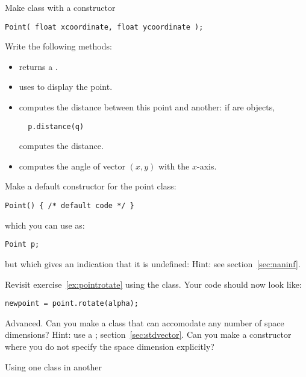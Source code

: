 \begin{exercise}
  \label{ex:geom:point}
  Make class  with a constructor
\begin{verbatim}
Point( float xcoordinate, float ycoordinate );
\end{verbatim}
Write the following methods:
\begin{itemize}
\item {} returns a .
\item  {} uses  to display the point.
\item {} computes the distance between this point and
  another: if  are  objects,
\begin{verbatim}
  p.distance(q)
\end{verbatim}
computes the distance.
\item {} computes the angle of vector $(x,y)$ with the $x$-axis.
\end{itemize}
\end{exercise}


\begin{exercise}
  Make a default constructor for the point class:
\begin{verbatim}
Point() { /* default code */ }
\end{verbatim}
  which you can use as:
\begin{verbatim}
Point p;
\end{verbatim}
but which gives an indication that it is undefined:
%
%
Hint: see section~\ref{sec:naninf}.
\end{exercise}

\begin{exercise}
  \label{ex:pointrotate-class}
  Revisit exercise~\ref{ex:pointrotate} using the 
  class. Your code should now look like:
\begin{verbatim}
newpoint = point.rotate(alpha);
\end{verbatim}
\end{exercise}

\begin{exercise}
  Advanced. Can you make a  class that can accomodate any
  number of space dimensions? Hint: use a ;
  section~\ref{sec:stdvector}. Can you make a constructor where you do
  not specify the space dimension explicitly?
\end{exercise}

 {Using one class in another}
\label{sec:FuncHasPoint}
\label{sec:poly-rectangle}

